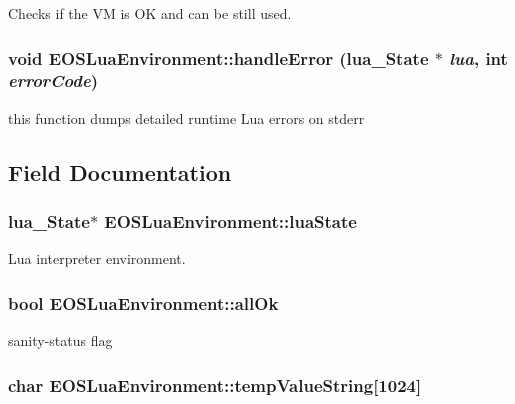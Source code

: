 Checks if the VM is OK and can be still used. 

\hypertarget{classEOSLuaEnvironment_8d4d4493b7762dc75eedcd5c5313b472}{
\subsubsection[{handleError}]{\setlength{\rightskip}{0pt plus 5cm}void EOSLuaEnvironment::handleError (lua\_\-State $\ast$ {\em lua}, \/  int {\em errorCode})}}
\label{classEOSLuaEnvironment_8d4d4493b7762dc75eedcd5c5313b472}


this function dumps detailed runtime Lua errors on stderr 



\subsection{Field Documentation}
\hypertarget{classEOSLuaEnvironment_0658d1e689f5a6cccdf4456a6a938b6f}{
\subsubsection[{luaState}]{\setlength{\rightskip}{0pt plus 5cm}lua\_\-State$\ast$ {\bf EOSLuaEnvironment::luaState}}}
\label{classEOSLuaEnvironment_0658d1e689f5a6cccdf4456a6a938b6f}


Lua interpreter environment. 

\hypertarget{classEOSLuaEnvironment_575f4654bd2650a110661fd4e4d56a6d}{
\subsubsection[{allOk}]{\setlength{\rightskip}{0pt plus 5cm}bool {\bf EOSLuaEnvironment::allOk}}}
\label{classEOSLuaEnvironment_575f4654bd2650a110661fd4e4d56a6d}


sanity-status flag 

\hypertarget{classEOSLuaEnvironment_38958bc6b0b6e68b9a66b6e9ff21f5ec}{
\subsubsection[{tempValueString}]{\setlength{\rightskip}{0pt plus 5cm}char {\bf EOSLuaEnvironment::tempValueString}\mbox{[}1024\mbox{]}}}
\label{classEOSLuaEnvironment_38958bc6b0b6e68b9a66b6e9ff21f5ec}


